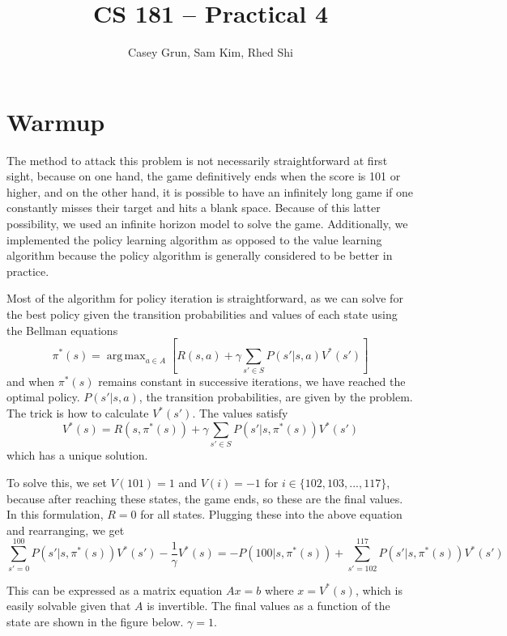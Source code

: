 \documentclass[11pt]{amsart}
\title{CS 181 -- Practical 4}
\author{Casey Grun, Sam Kim, Rhed Shi}
\DeclareMathOperator*{\argmax}{arg\,max}
\begin{document}
\maketitle

\section{Warmup}

The method to attack this problem is not necessarily straightforward at first sight, because on one hand, the game definitively ends when the score is 101 or higher, and on the other hand, it is possible to have an infinitely long game if one constantly misses their target and hits a blank space. Because of this latter possibility, we used an infinite horizon model to solve the game. Additionally, we implemented the policy learning algorithm as opposed to the value learning algorithm because the policy algorithm is generally considered to be better in practice.

Most of the algorithm for policy iteration is straightforward, as we can solve for the best policy given the transition probabilities and values of each state using the Bellman equations
$$\pi^*(s)=\argmax_{a\in A}\left[R(s,a)+\gamma\sum_{s'\in S} P(s'|s,a)V^*(s')\right]$$
and when $\pi^*(s)$ remains constant in successive iterations, we have reached the optimal policy. $P(s'|s,a)$, the transition probabilities, are given by the problem. The trick is how to calculate $V^*(s')$. The values satisfy
$$V^*(s)=R(s,\pi^*(s))+\gamma\sum_{s'\in S} P(s'|s,\pi^*(s))V^*(s')$$
which has a unique solution.

To solve this, we set $V(101)=1$ and $V(i)=-1$ for $i \in \{102,103,...,117\}$, because after reaching these states, the game ends, so these are the final values. In this formulation, $R=0$ for all states. Plugging these into the above equation and rearranging, we get
$$\sum_{s'=0}^{100} P(s'|s,\pi^*(s))V^*(s') - \frac{1}{\gamma}V^*(s)=-P(100|s,\pi^*(s))+\sum_{s'=102}^{117} P(s'|s,\pi^*(s))V^*(s')$$

This can be expressed as a matrix equation $Ax=b$ where $x=V^*(s)$, which is easily solvable given that $A$ is invertible. The final values as a function of the state are shown in the figure below. $\gamma=1$.
\end{document}
